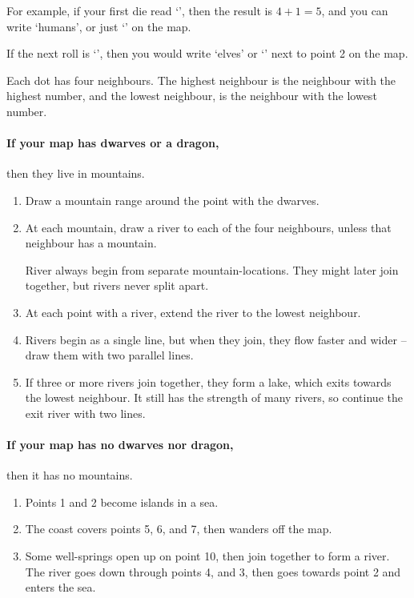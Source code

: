 \begin{multicols}{2}
\begin{multicols}{2}
\end{multicols}

\begin{exampletext}
  For example, if your first die read `', then the result is $4+1 = 5$, and you can write `humans', or just `\Hu' on the map.

  If the next roll is `', then you would write `elves' or `\El' next to point 2 on the map.
\end{exampletext}

Each dot has four neighbours.
The highest neighbour is the neighbour with the highest number, and the lowest neighbour, is the neighbour with the lowest number.


\paragraph{If your map has dwarves or a dragon,}
then they live in mountains.

\begin{enumerate}
  \item
  Draw a mountain range around the point with the dwarves.
  \item
  At each mountain, draw a river to each of the four neighbours, unless that neighbour has a mountain.

  River always begin from separate mountain-locations.
  They might later join together, but rivers never split apart.
  \item
  At each point with a river, extend the river to the lowest neighbour.
  \item
  Rivers begin as a single line, but when they join, they flow faster and wider -- draw them with two parallel lines.
  \item
  If three or more rivers join together, they form a lake, which exits towards the lowest neighbour.
  It still has the strength of many rivers, so continue the exit river with two lines.
\end{enumerate}

\paragraph{If your map has no dwarves nor dragon,}
then it has no mountains.

\begin{enumerate}
  \item
  Points 1 and 2 become islands in a sea.
  \item
  The coast covers points 5, 6, and 7, then wanders off the map.
  \item
  Some well-springs open up on point 10, then join together to form a river.
  The river goes down through points 4, and 3, then goes towards point 2 and enters the sea.
\end{enumerate}


\end{multicols}
